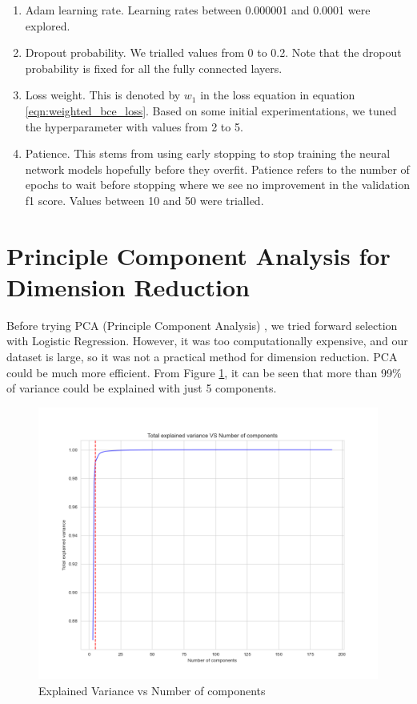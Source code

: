 \documentclass[a4paper,11pt]{report}
\begin{document}
\begin{enumerate}
    \item Adam learning rate. Learning rates between 0.000001 and 0.0001 were explored. 
    \item Dropout probability. We trialled values from 0 to 0.2. Note that the dropout probability is fixed for all the fully connected layers. 
    \item Loss weight. This is denoted by $w_1$ in the loss equation in equation \ref{eqn:weighted_bce_loss}. Based on some initial experimentations, we tuned the hyperparameter with values from 2 to 5. 
    \item Patience. This stems from using early stopping to stop training the neural network models hopefully before they overfit. Patience refers to the number of epochs to wait before stopping where we see no improvement in the validation f1 score. Values between 10 and 50 were trialled. 
\end{enumerate}

\section{Principle Component Analysis for Dimension Reduction}

Before trying PCA (Principle Component Analysis) \citep{bro2014principal}, we tried forward selection with Logistic Regression. However, it was too computationally expensive, and our dataset is large, so it was not a practical method for dimension reduction. PCA could be much more efficient. From Figure \ref{fig:PCA}, it can be seen that more than 99\% of variance could be explained with just 5 components.

\begin{figure}[H]
\begin{center}
\includegraphics[height=0.5\textwidth]{images/PCA_for_mean.png}
\caption{Explained Variance vs Number of components}
\label{fig:PCA}
\end{center}
\end{figure}
\end{document}
